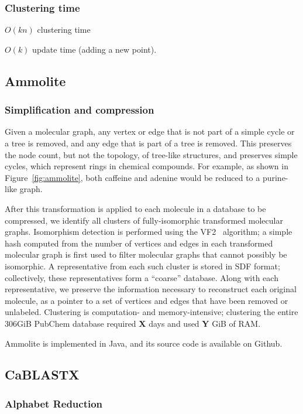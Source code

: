 \documentclass[review,preprint,12pt]{elsarticle}
\renewcommand{\cite}{\citep} %
\theoremstyle{definition}
\theoremstyle{remark}
\begin{document}
\subsubsection{Clustering time}

$O(kn)$ clustering time

$O(k)$ update time (adding a new point).

\subsection{Ammolite}

\subsubsection{Simplification and compression}

Given a molecular graph, any vertex or edge that is not part of a simple cycle or a tree is removed, and any edge that is part
of a tree is removed.
This preserves the node count, but not the topology, of tree-like structures, and preserves simple cycles,
which represent rings in chemical compounds.
For example, as shown in Figure~\ref{fig:ammolite}, both caffeine and adenine would be reduced to a purine-like graph.

After this transformation is applied to each molecule in a database to be compressed, we identify all clusters
of fully-isomorphic transformed molecular graphs.
Isomorphism detection is performed using the VF2~\cite{cordella2001improved} 
algorithm; a simple hash computed from the
number of vertices and edges in each transformed molecular graph is first used 
to filter molecular graphs that cannot possibly be isomorphic.
A representative from each such cluster is stored in SDF format; collectively, these representatives form a 
``coarse'' database.
Along with each representative, we preserve the information necessary to reconstruct each original molecule,
as a pointer to a set of vertices and edges that have been removed or unlabeled.
Clustering is computation- and memory-intensive; clustering the entire 306GiB PubChem database required \textbf{X} days and used \textbf{Y} GiB of RAM.

Ammolite is implemented in Java, and its source code is available on Github.

\subsection{CaBLASTX}

\subsubsection{Alphabet Reduction}
\end{document}
